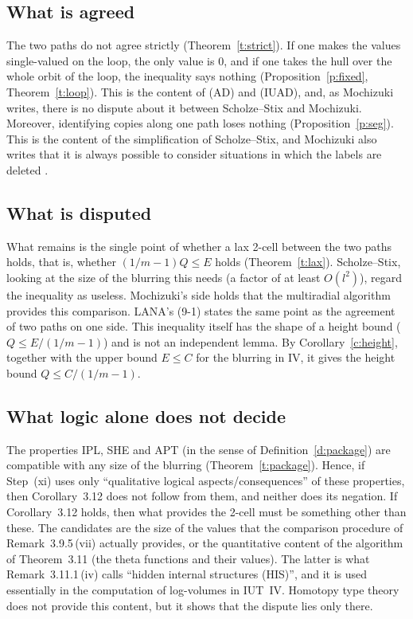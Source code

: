 \documentclass[11pt,a4paper]{article}
\newcommand{\q}[1]{``#1''}
\theoremstyle{plain}
\theoremstyle{definition}
\theoremstyle{remark}
\begin{document}
\subsection{What is agreed}
The two paths do not agree strictly (Theorem~\ref{t:strict}). If one makes the values single-valued on the loop, the
only value is $0$, and if one takes the hull over the whole orbit of the loop, the inequality says nothing
(Proposition~\ref{p:fixed}, Theorem~\ref{t:loop}). This is the content of (AD) and (IUAD), and, as Mochizuki writes,
there is no dispute about it between Scholze--Stix and Mochizuki. Moreover, identifying copies along one path loses
nothing (Proposition~\ref{p:seg}). This is the content of the simplification of Scholze--Stix, and Mochizuki also
writes that it is always possible to consider situations in which the labels are deleted
\cite[Example~2.4.8\,(iv-c)]{Ess}.

\subsection{What is disputed}
What remains is the single point of whether a lax 2-cell between the two paths holds, that is, whether
$(1/m-1)Q\le E$ holds (Theorem~\ref{t:lax}). Scholze--Stix, looking at the size of the blurring this needs (a factor of
at least $O(l^2)$), regard the inequality as useless. Mochizuki's side holds that the multiradial algorithm provides
this comparison. LANA's (9-1) states the same point as the agreement of two paths on one side. This inequality itself
has the shape of a height bound ($Q\le E/(1/m-1)$) and is not an independent lemma. By Corollary~\ref{c:height},
together with the upper bound $E\le C$ for the blurring in IV, it gives the height bound $Q\le C/(1/m-1)$.

\subsection{What logic alone does not decide}
The properties IPL, SHE and APT (in the sense of Definition~\ref{d:package}) are compatible with any size of the
blurring (Theorem~\ref{t:package}). Hence, if Step~(xi) uses only \q{qualitative logical aspects/consequences} of these properties, then
Corollary~3.12 does not follow from them, and neither does its negation. If Corollary~3.12 holds, then what provides the
2-cell must be something other than these. The candidates are the size of the values that the comparison procedure of
Remark~3.9.5\,(vii) actually provides, or the quantitative content of the algorithm of Theorem~3.11 (the theta
functions and their values). The latter is what Remark~3.11.1\,(iv) calls \q{hidden internal structures (HIS)}, and it is used essentially in the
computation of log-volumes in IUT~IV. Homotopy type theory does not provide this content, but it shows that the dispute
lies only there.
\end{document}
